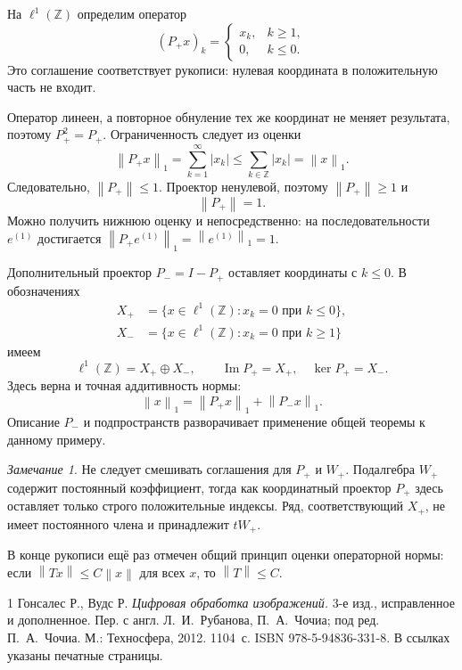 \documentclass[12pt,a4paper]{article}
\theoremstyle{definition}
\theoremstyle{remark}
\newtheorem*{remark}{Замечание}
\newcommand{\ZZ}{\mathbb{Z}}
\newcommand{\norm}[1]{\left\lVert #1\right\rVert}
\begin{document}
На $\ell^1(\ZZ)$ определим оператор
\[
  \boxed{(P_+x)_k=
    \begin{cases}
      x_k,&k\geqslant1,\\
      0,&k\leqslant0.
    \end{cases}}
\]
Это соглашение соответствует рукописи: нулевая координата
в положительную часть не входит.

Оператор линеен, а повторное обнуление тех же координат не меняет
результата, поэтому $P_+^2=P_+$. Ограниченность следует из оценки
\[
  \norm{P_+x}_1=\sum_{k=1}^{\infty}|x_k|
  \leqslant\sum_{k\in\ZZ}|x_k|=\norm{x}_1.
\]
Следовательно, $\norm{P_+}\leqslant1$. Проектор ненулевой,
поэтому $\norm{P_+}\geqslant1$ и
\[
  \boxed{\norm{P_+}=1}.
\]
Можно получить нижнюю оценку и непосредственно: на последовательности
$e^{(1)}$ достигается $\norm{P_+e^{(1)}}_1=\norm{e^{(1)}}_1=1$.

Дополнительный проектор $P_-=I-P_+$ оставляет координаты с $k\leqslant0$.
В обозначениях
\begin{align*}
  X_+&=\{x\in\ell^1(\ZZ):x_k=0\text{ при }k\leqslant0\},\\
  X_-&=\{x\in\ell^1(\ZZ):x_k=0\text{ при }k\geqslant1\}
\end{align*}
имеем
\[
  \ell^1(\ZZ)=X_+\oplus X_-,\qquad
  \operatorname{Im}P_+=X_+,\quad\ker P_+=X_-.
\]
Здесь верна и точная аддитивность нормы:
\[
  \norm{x}_1=\norm{P_+x}_1+\norm{P_-x}_1.
\]
Описание $P_-$ и подпространств разворачивает применение общей
теоремы к данному примеру.

\begin{remark}
Не следует смешивать соглашения для $P_+$ и $W_+$.
Подалгебра $W_+$ содержит постоянный коэффициент, тогда как
координатный проектор $P_+$ здесь оставляет только строго
положительные индексы. Ряд, соответствующий $X_+$, не имеет
постоянного члена и принадлежит $tW_+$.
\end{remark}

В конце рукописи ещё раз отмечен общий принцип оценки операторной
нормы: если $\norm{Tx}\leqslant C\norm{x}$ для всех $x$, то
$\norm{T}\leqslant C$.

\begingroup
\small
\begin{thebibliography}{1}
Гонсалес Р., Вудс Р.
\emph{Цифровая обработка изображений.}
3-е изд., исправленное и дополненное.
Пер. с англ. Л.~И.~Рубанова, П.~А.~Чочиа;
под ред. П.~А.~Чочиа. М.: Техносфера, 2012. 1104~с.
ISBN 978-5-94836-331-8.
В ссылках указаны печатные страницы.
\end{thebibliography}
\endgroup
\end{document}
